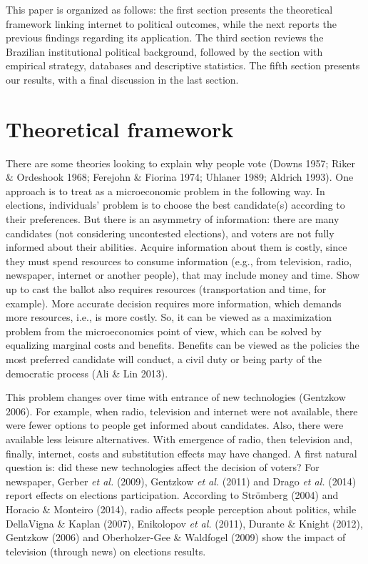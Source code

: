 \documentclass[
  12pt,
]{article}
\begin{document}
This paper is organized as follows: the first section presents the
theoretical framework linking internet to political outcomes, while the
next reports the previous findings regarding its application. The third
section reviews the Brazilian institutional political background,
followed by the section with empirical strategy, databases and
descriptive statistics. The fifth section presents our results, with a
final discussion in the last section.

\hypertarget{theoretical-framework}{%
\section{Theoretical framework}\label{theoretical-framework}}

There are some theories looking to explain why people vote (Downs 1957;
Riker \& Ordeshook 1968; Ferejohn \& Fiorina 1974; Uhlaner 1989; Aldrich
1993). One approach is to treat as a microeconomic problem in the
following way. In elections, individuals' problem is to choose the best
candidate(s) according to their preferences. But there is an asymmetry
of information: there are many candidates (not considering uncontested
elections), and voters are not fully informed about their abilities.
Acquire information about them is costly, since they must spend
resources to consume information (e.g., from television, radio,
newspaper, internet or another people), that may include money and time.
Show up to cast the ballot also requires resources (transportation and
time, for example). More accurate decision requires more information,
which demands more resources, i.e., is more costly. So, it can be viewed
as a maximization problem from the microeconomics point of view, which
can be solved by equalizing marginal costs and benefits. Benefits can be
viewed as the policies the most preferred candidate will conduct, a
civil duty or being party of the democratic process (Ali \& Lin 2013).

This problem changes over time with entrance of new technologies
(Gentzkow 2006). For example, when radio, television and internet were
not available, there were fewer options to people get informed about
candidates. Also, there were available less leisure alternatives. With
emergence of radio, then television and, finally, internet, costs and
substitution effects may have changed. A first natural question is: did
these new technologies affect the decision of voters? For newspaper,
Gerber \emph{et al.} (2009), Gentzkow \emph{et al.} (2011) and Drago
\emph{et al.} (2014) report effects on elections participation.
According to Strömberg (2004) and Horacio \& Monteiro (2014), radio
affects people perception about politics, while DellaVigna \& Kaplan
(2007), Enikolopov \emph{et al.} (2011), Durante \& Knight (2012),
Gentzkow (2006) and Oberholzer-Gee \& Waldfogel (2009) show the impact
of television (through news) on elections results.
\end{document}
